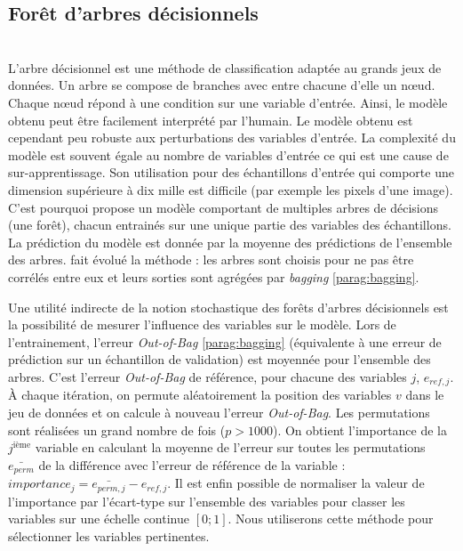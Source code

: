 \subsection{Forêt d'arbres décisionnels}\mbox{\label{parag:random_forests}} \\
L'arbre décisionnel est une méthode de classification adaptée au grands jeux de données.
Un arbre se compose de branches avec entre chacune d'elle un nœud.
Chaque nœud répond à une condition sur une variable d'entrée.
Ainsi, le modèle obtenu peut être facilement interprété par l'humain.
Le modèle obtenu est cependant peu robuste aux perturbations des variables d'entrée.
La complexité du modèle est souvent égale au nombre de variables d'entrée ce qui est une cause de sur-apprentissage.
Son utilisation pour des échantillons d'entrée qui comporte une dimension supérieure à dix mille est difficile (par exemple les pixels d'une image).
C'est pourquoi \citeauthor{ho_random_1995}
\cite{ho_random_1995, ho_random_1998} propose un modèle comportant de multiples arbres de décisions (une forêt), chacun entrainés sur une unique partie des variables des échantillons.
La prédiction du modèle est donnée par la moyenne des prédictions de l'ensemble des arbres. 
\citeauthor{breiman_random_2001} \cite{breiman_random_2001} fait évolué la méthode : les arbres sont choisis pour ne pas être corrélés entre eux et leurs sorties sont agrégées par \textit{bagging} \ref{parag:bagging}.

Une utilité indirecte de la notion stochastique des forêts d'arbres décisionnels est la possibilité de mesurer l'influence des variables sur le modèle.
Lors de l'entrainement, l'erreur \textit{Out-of-Bag} \ref{parag:bagging} (équivalente à une erreur de prédiction sur un échantillon de validation) est moyennée pour l'ensemble des arbres.
C'est l'erreur \textit{Out-of-Bag} de référence, pour chacune des variables $j$, $e_{ref, j}$.
À chaque itération, on permute aléatoirement la position des variables $v$ dans le jeu de données et on calcule à nouveau l'erreur \textit{Out-of-Bag}.
Les permutations sont réalisées un grand nombre de fois ($p > 1000$).
On obtient l'importance de la $j^{\text{ième}}$ variable en calculant la moyenne de l'erreur sur toutes les permutations $\bar{e_{perm}}$ de la différence avec l'erreur de référence de la variable : $importance_{j} = \bar{e_{perm, j}} - e_{ref, j}$.
Il est enfin possible de normaliser la valeur de l'importance par l'écart-type sur l'ensemble des variables pour classer les variables sur une échelle continue $[0 ; 1]$.
Nous utiliserons cette méthode pour sélectionner les variables pertinentes.

